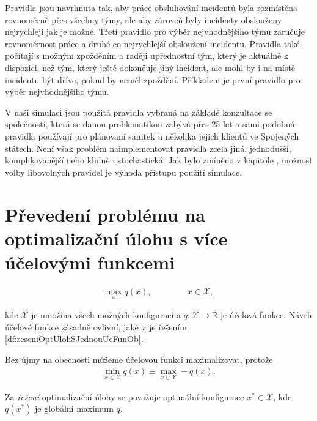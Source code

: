 Pravidla jsou navrhnuta tak, aby práce obsluhování incidentů byla rozmístěna rovnoměrně přes všechny týmy, ale aby zároveň byly incidenty obslouženy nejrychleji jak je možné.
Třetí pravidlo pro výběr nejvhodnějšího týmu zaručuje rovnoměrnost práce a druhé co nejrychlejší obsloužení incidentu.
Pravidla také počítají s možným zpožděním a raději upřednostní tým, který je aktuálně k dispozici, než tým, který ještě dokončuje jiný incident, ale mohl by i na místě incidentu
být dříve, pokud by neměl zpoždění. Příkladem je první pravidlo pro výběr nejvhodnějšího týmu.

V naší simulaci jsou použitá pravidla vybraná na základě konzultace se společností, která se danou problematikou zabývá přes 25 let a sami podobná pravidla používají pro plánovaní sanitek
u několika jejich klientů ve Spojených státech.
Není však problém naimplementovat pravidla zcela jiná, jednodušší, komplikovanější nebo klidně i stochastická.
Jak bylo zmíněno v kapitole \label{kap:procSimulace}, možnost volby libovolných pravidel je výhoda přístupu použití simulace.

\section{Převedení problému na optimalizační úlohu s více účelovými funkcemi}\label{kap:optUloha2uc}

\begin{definice}\label{df:optUloha1ucObecne}
  \begin{align*}
    \max_{x} q(x), \hspace{50pt} x \in \mathcal{X},
  \end{align*}

  kde $\mathcal{X}$ je množina všech možných konfigurací a $q \colon \mathcal{X} \rightarrow \mathbb{R}$ je účelová funkce.
  Návrh účelové funkce zásadně ovlivní, jaké $x$ je řešením \ref{df:reseniOptUlohSJednouUcFunOb}.

  Bez újmy na obecnosti můžeme účelovou funkci maximalizovat, protože
  \begin{align*}
    \min_{x \in \mathcal{X}} q(x) \equiv \max_{x \in \mathcal{X}} -q(x).
  \end{align*}
\end{definice}

\begin{definice}\label{df:reseniOptUlohSJednouUcFunOb}
  Za \textit{řešení} optimalizační úlohy se považuje optimální konfigurace $x^* \in \mathcal{X}$,
  kde $q(x^*)$ je globální maximum $q$.
\end{definice}


